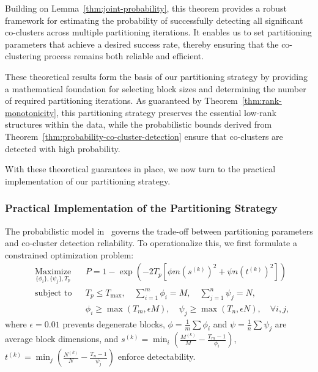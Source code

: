 \documentclass[journal]{IEEEtran}
\begin{document}
Building on Lemma~\ref{thm:joint-probability}, this theorem provides a robust framework for estimating the probability of successfully detecting all significant co-clusters across multiple partitioning iterations. It enables us to set partitioning parameters that achieve a desired success rate, thereby ensuring that the co-clustering process remains both reliable and efficient.

These theoretical results form the basis of our partitioning strategy by providing a mathematical foundation for selecting block sizes and determining the number of required partitioning iterations. As guaranteed by Theorem~\ref{thm:rank-monotonicity}, this partitioning strategy preserves the essential low-rank structures within the data, while the probabilistic bounds derived from Theorem~\ref{thm:probability-co-cluster-detection} ensure that co-clusters are detected with high probability.

With these theoretical guarantees in place, we now turn to the practical implementation of our partitioning strategy.

\subsubsection{Practical Implementation of the Partitioning Strategy}
\label{subsec:practical-implementation}
The probabilistic model in~ governs the trade-off between partitioning parameters and co-cluster detection reliability. To operationalize this, we first formulate a constrained optimization problem:
\begin{equation}
    \begin{aligned}
         & \underset{\{\phi_i\}, \{\psi_j\}, T_p}{\text{Maximize}}
         &                                                         & P = 1 - \exp\left( -2 T_p \left[ \phi m (s^{(k)})^2 + \psi n (t^{(k)})^2 \right] \right)                                                                                                  \\
         & \text{subject to}
         &                                                         & T_p \leq T_{\text{max}}, \quad \sum_{i=1}^m \phi_i = M, \quad \sum_{j=1}^n \psi_j = N,                                                                                                    \\
         &                                                         &                                                                                          & \phi_i \geq \max(T_m, \epsilon M), \quad \psi_j \geq \max(T_n, \epsilon N), \quad \forall i,j,
    \end{aligned}
\end{equation}
where $\epsilon = 0.01$ prevents degenerate blocks, $\phi = \frac{1}{m}\sum \phi_i$ and $\psi = \frac{1}{n}\sum \psi_j$ are average block dimensions, and $s^{(k)} = \min_i \left( \frac{M^{(k)}}{M} - \frac{T_m-1}{\phi_i} \right)$, $t^{(k)} = \min_j \left( \frac{N^{(k)}}{N} - \frac{T_n-1}{\psi_j} \right)$ enforce detectability.
\end{document}
